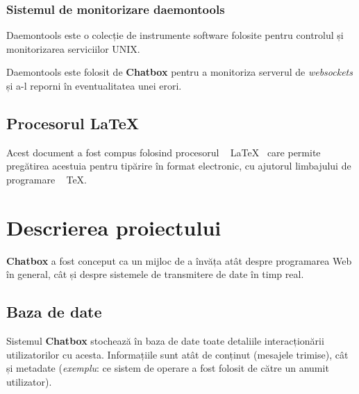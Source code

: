 \documentclass[12pt,a4paper]{article}
\begin{document}
\subsubsection{Sistemul de monitorizare daemontools}
Daemontools\cite{daemon} este o colecție de instrumente software folosite pentru 
controlul și monitorizarea serviciilor UNIX. 

Daemontools este folosit de \textbf{Chatbox} pentru a monitoriza serverul 
de \textit{websockets} și a-l reporni  în eventualitatea unei erori.

\subsection{Procesorul \LaTeX}
Acest document a fost compus folosind procesorul ~ \LaTeX ~ care permite pregătirea
acestuia pentru tipărire în format electronic,
cu ajutorul limbajului de programare ~ \TeX.



\newpage
\section{Descrierea proiectului}
\textbf{Chatbox} a fost conceput ca un mijloc de a învăța atât despre programarea
Web în general, cât și despre sistemele de transmitere de date în timp real.

\subsection{Baza de date}
Sistemul \textbf{Chatbox} stochează  în baza de date toate detaliile interacționării
utilizatorilor cu acesta. Informațiile sunt atât de conținut 
(mesajele trimise), cât și metadate (\textit{exemplu}: ce sistem de operare a fost folosit de către un anumit utilizator).

\end{document}
